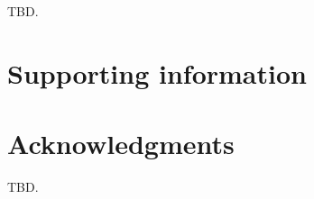 \documentclass[10pt,letterpaper]{article}
\begin{document}
TBD.

\section*{Supporting information}


\section*{Acknowledgments}
TBD.

\nolinenumbers

%
%
%








\end{document}
